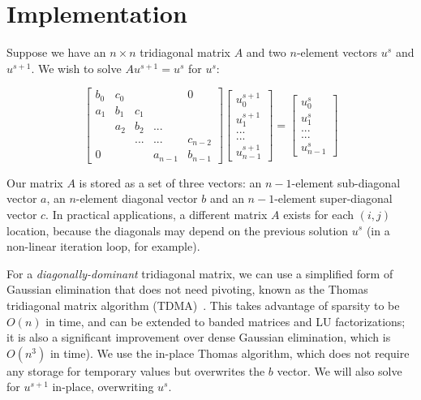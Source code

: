 \documentclass[conference]{IEEEtran}
\begin{document}
\section{Implementation}

Suppose we have an $n \times n$
tridiagonal matrix $A$ and two $n$-element vectors $u^{s}$ and $u^{s+1}$. We
wish to solve $Au^{s+1} = u^{s}$ for $u^{s}$:

\[
\begin{bmatrix}
b_0 & c_0 &     &         & 0       \\
a_1 & b_1 & c_1 &         &         \\
    & a_2 & b_2 & ...     &         \\
    &     & ... & ...     & c_{n-2} \\
0   &     &     & a_{n-1} & b_{n-1}
\end{bmatrix}
\begin{bmatrix}
u^{s+1}_0     \\
u^{s+1}_1     \\
...     \\
...     \\
u^{s+1}_{n-1}
\end{bmatrix}
=
\begin{bmatrix}
u^{s}_0     \\
u^{s}_1     \\
...     \\
...     \\
u^{s}_{n-1}
\end{bmatrix}
\]

Our matrix $A$ is stored as a set of three vectors: an $n-1$-element
sub-diagonal vector $a$, an $n$-element diagonal vector $b$ and an $n-1$-element
super-diagonal vector $c$.
In practical applications, a different matrix $A$ exists for
  each $(i,j)$ location, because the diagonals may depend on the previous 
  solution $u^{s}$ (in a non-linear iteration loop, for example).

For a \emph{diagonally-dominant} tridiagonal matrix,
  we can use a simplified form of Gaussian elimination 
  that does not need pivoting, known as the Thomas 
  tridiagonal matrix algorithm (TDMA)~\cite{TDMA}. 
This takes advantage of sparsity to be \(O(n)\) in time, 
  and can be extended to banded matrices and LU factorizations;
  it is also a significant improvement over dense Gaussian elimination,
  which is \(O(n^3)\) in time). 
We use the in-place Thomas algorithm,
which does not require any storage for temporary values but overwrites the $b$
vector. We will also solve for $u^{s+1}$ in-place, overwriting $u^{s}$.
\end{document}
